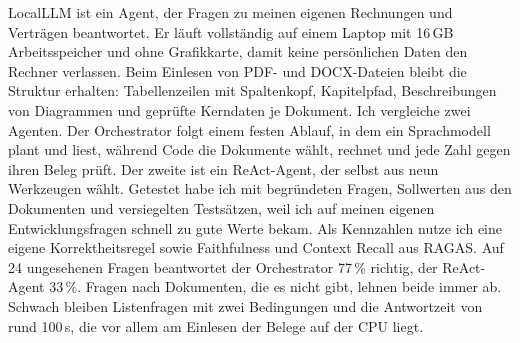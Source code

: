 

\makeatletter
\renewenvironment{abstract}{%
    \thispagestyle{empty}
    \@beginparpenalty\@lowpenalty
    \begin{center}%
        \bfseries \abstractname
        \@endparpenalty\@M
    \end{center}
}%

{\par\vfil\null}
\makeatother

\begin{abstract}
LocalLLM ist ein Agent, der Fragen zu meinen eigenen Rechnungen und Verträgen beantwortet. Er läuft vollständig auf einem Laptop mit 16\,GB Arbeitsspeicher und ohne Grafikkarte, damit keine persönlichen Daten den Rechner verlassen. Beim Einlesen von PDF- und DOCX-Dateien bleibt die Struktur erhalten: Tabellenzeilen mit Spaltenkopf, Kapitelpfad, Beschreibungen von Diagrammen und geprüfte Kerndaten je Dokument. Ich vergleiche zwei Agenten. Der Orchestrator folgt einem festen Ablauf, in dem ein Sprachmodell plant und liest, während Code die Dokumente wählt, rechnet und jede Zahl gegen ihren Beleg prüft. Der zweite ist ein ReAct-Agent, der selbst aus neun Werkzeugen wählt. Getestet habe ich mit begründeten Fragen, Sollwerten aus den Dokumenten und versiegelten Testsätzen, weil ich auf meinen eigenen Entwicklungsfragen schnell zu gute Werte bekam. Als Kennzahlen nutze ich eine eigene Korrektheitsregel sowie Faithfulness und Context Recall aus RAGAS. Auf 24 ungesehenen Fragen beantwortet der Orchestrator 77\,\% richtig, der ReAct-Agent 33\,\%. Fragen nach Dokumenten, die es nicht gibt, lehnen beide immer ab. Schwach bleiben Listenfragen mit zwei Bedingungen und die Antwortzeit von rund 100\,s, die vor allem am Einlesen der Belege auf der CPU liegt.
\end{abstract}

